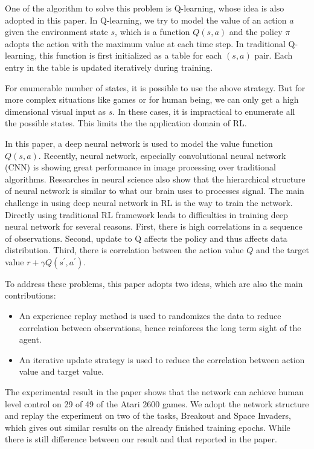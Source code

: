 \documentclass[10pt,twocolumn,letterpaper]{article}
\begin{document}
\begin{CJK}{UTF8}{gbsn}
One of the algorithm to solve this problem is Q-learning, whose idea is also adopted in this paper. In Q-learning, we try to model the value of an action $a$ given the environment state $s$, which is a function $Q(s, a)$ and the policy $\pi$ adopts the action with the maximum value at each time step. In traditional Q-learning, this function is first initialized as a table for each $(s, a)$ pair. Each entry in the table is updated iteratively during training. 

For enumerable number of states, it is possible to use the above strategy. But for more complex situations like games or for human being, we can only get a high dimensional visual input as $s$. In these cases, it is impractical to enumerate all the possible states. This limits the the application domain of RL.

In this paper, a deep neural network is used to model the value function $Q(s, a)$. Recently, neural network, especially convolutional neural network (CNN) is showing great performance in image processing over traditional algorithms. Researches in neural science also show that the hierarchical structure of neural network is similar to what our brain uses to processes signal. The main challenge in using deep neural network in RL is the way to train the network. Directly using traditional RL framework leads to difficulties in training deep neural network for several reasons. First, there is high correlations in a sequence of observations. Second, update to Q affects the policy and thus affects data distribution. Third, there is correlation between the action value $Q$ and the target value $r+\gamma Q(s^\prime, a^\prime)$.

To address these problems, this paper adopts two ideas, which are also the main contributions:
\begin{itemize}
    \item An experience replay method is used to randomizes the data to reduce correlation between observations, hence reinforces the long term sight of the agent.
    \item An iterative update strategy is used to reduce the correlation between action value and target value.
\end{itemize}
The experimental result in the paper shows that the network can achieve human level control on 29 of 49 of the Atari 2600 games. We adopt the network structure and replay the experiment on two of the tasks, Breakout and Space Invaders, which gives out similar results on the already finished training epochs. While there is still difference between our result and that reported in the paper.



\end{CJK}
\end{document}
